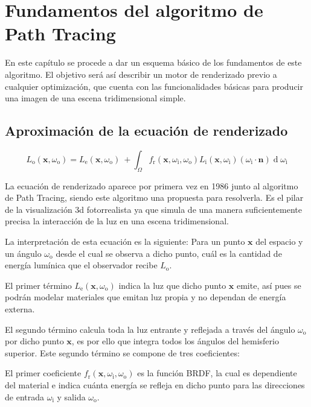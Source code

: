 \chapter{Fundamentos del algoritmo de Path Tracing}
	

En este capítulo se procede a dar un esquema básico de los fundamentos de este algoritmo. El objetivo será así describir un motor de renderizado previo a cualquier optimización, que cuenta con las funcionalidades básicas para producir una imagen de una escena tridimensional simple.

	\section{Aproximación de la ecuación de renderizado}
\[
{\displaystyle L_{\text{o}}(\mathbf {x} ,\omega _{\text{o}})=L_{\text{e}}(\mathbf {x} ,\omega _{\text{o}})\ +\int _{\Omega }f_{\text{r}}(\mathbf {x} ,\omega _{\text{i}},\omega _{\text{o}})L_{\text{i}}(\mathbf {x} ,\omega _{\text{i}})(\omega _{\text{i}}\cdot \mathbf {n} )\operatorname {d} \omega _{\text{i}}}
\]

La ecuación de renderizado \cite{kajiya1986rendering} aparece por primera vez en 1986 junto al algoritmo de Path Tracing, siendo este algoritmo una propuesta para resolverla. Es el pilar de la visualización 3d fotorrealista ya que simula de una manera suficientemente precisa la interacción de la luz en una escena tridimensional.

La interpretación de esta ecuación es la siguiente: Para un punto $\mathbf {x}$ del espacio y un ángulo $\omega _{\text{o}}$ desde el cual se observa a dicho punto, cuál es la cantidad de energía lumínica que el observador recibe $L_{\text{o}}$.

El primer término $L_{\text{e}}(\mathbf {x} ,\omega _{\text{o}})$ indica la luz que dicho punto $\mathbf {x}$ emite, así pues se podrán modelar materiales que emitan luz propia y no dependan de energía externa.

El segundo término calcula toda la luz entrante y reflejada a través del ángulo $\omega _{\text{o}}$ por dicho punto $\mathbf {x}$, es por ello que integra todos los ángulos del hemisferio superior. Este segundo término se compone de tres coeficientes:

El primer coeficiente $f_{\text{r}}(\mathbf {x} ,\omega _{\text{i}},\omega _{\text{o}})$ es la función BRDF, la cual es dependiente del material e indica cuánta energía se refleja en dicho punto para las direcciones de entrada $\omega _{\text{i}}$ y salida $\omega _{\text{o}}$.

